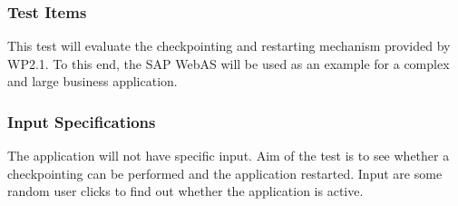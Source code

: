 





\subsubsection{Test Items}
This test will evaluate the checkpointing and restarting mechanism provided by WP2.1. To this end, the SAP WebAS will be used as an example for a complex and large business application.

\subsubsection{Input Specifications}
The application will not have specific input. Aim of the test is to see whether a checkpointing can be performed and the application restarted. Input are some random user clicks to find out whether the application is active.

